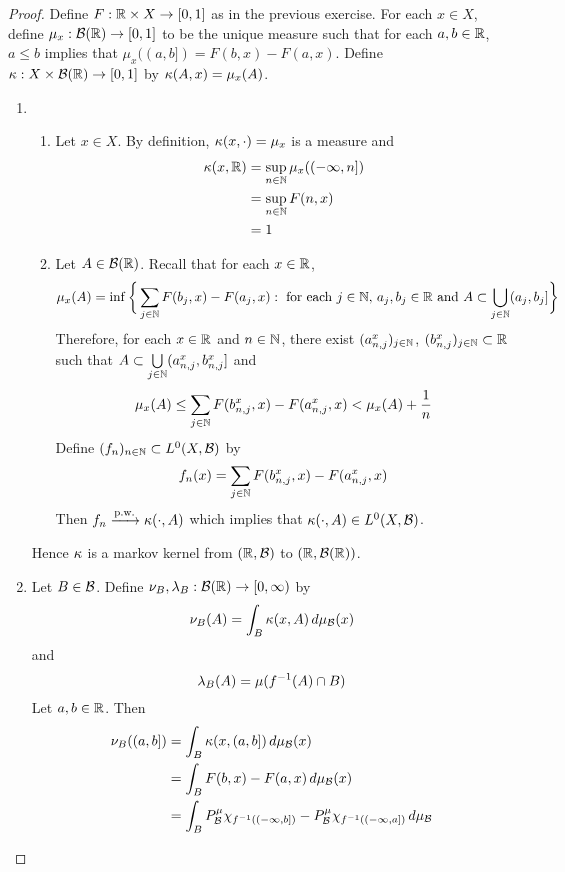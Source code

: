 \documentclass{book}
\begin{document}
	\begin{proof} Define $F:\mathbb{R} \times X \rightarrow [0,1]$ as in the previous exercise. For each $x \in X$, define $\mu_x: \mathcal{B}(\mathbb{R}) \rightarrow [0,1]$ to be the unique measure such that for each $a, b \in \mathbb{R}$, $a \leq b$ implies that $\mu_x((a,b]) = F(b, x) - F(a, x)$. Define $\kappa: X \times \mathcal{B}(\mathbb{R}) \rightarrow [0,1]$ by $\kappa(A, x) = \mu_x(A)$. \\
		\begin{enumerate}
			\item \
			\begin{enumerate}
				\item Let $x \in X$. By definition, $\kappa(x, \cdot) = \mu_x$ is a measure and 
				\begin{align*}
					\kappa(x, \mathbb{R}) 
					& = \sup_{n \in \mathbb{N}} \mu_x((-\infty, n])\\
					& = \sup_{n \in \mathbb{N}} F(n, x) \\
					& = 1 
				\end{align*}
				\item Let $A \in \mathcal{B}(\mathbb{R})$. Recall that for each $x \in \mathbb{R}$,
				$$\mu_x(A) = \inf \bigg \{ \sum\limits_{j \in \mathbb{N}} F(b_j, x) - F(a_j, x): \text{ for each $j \in \mathbb{N}$, $a_j, b_j \in \mathbb{R}$ and } A \subset \bigcup\limits_{j \in \mathbb{N}} (a_j, b_j] \bigg \}$$ 
				Therefore, for each $x \in \mathbb{R}$ and $n \in \mathbb{N}$, there exist $(a^x_{n,j})_{j \in \mathbb{N}}$, $(b^x_{n,j})_{j \in \mathbb{N}} \subset \mathbb{R}$ such that $A \subset \bigcup\limits_{j \in \mathbb{N}} (a^x_{n,j}, b^x_{n,j}]$ and 
				$$\mu_x(A) \leq \sum\limits_{j \in \mathbb{N}} F(b^x_{n,j}, x) - F(a^x_{n,j}, x) < \mu_x(A) + \frac{1}{n}$$
				Define $(f_n)_{n \in \mathbb{N}} \subset L^0(X, \mathcal{B})$ by $$f_n(x) = \sum\limits_{j \in \mathbb{N}} F(b^x_{n,j}, x) - F(a^x_{n,j}, x)$$
				Then $f_n \xrightarrow{\text{p.w.}} \kappa(\cdot, A)$ which implies that $\kappa(\cdot, A) \in L^0(X, \mathcal{B})$. 
			\end{enumerate}
			Hence $\kappa$ is a markov kernel from $(\mathbb{R}, \mathcal{B})$ to $(\mathbb{R}, \mathcal{B}(\mathbb{R}))$.\\
			\item Let $B \in \mathcal{B}$. Define $\nu_B, \lambda_{B}:\mathcal{B}(\mathbb{R}) \rightarrow [0,\infty)$ by 
			$$\nu_B(A) = \int_B \kappa(x, A) \, d \mu_{\mathcal{B}}(x)$$ 
			and
			$$\lambda_B(A) = \mu(f^{-1}(A) \cap B)$$ 
			Let $a,b \in \mathbb{R}$. Then 
			\begin{align*}
				\nu_B((a,b]) 
				& = \int_B \kap(x, (a,b]) \dmu_{\MB}(x) \\
				& = \int_{B} F(b, x) - F(a,x) \dmu_{\MB}(x) \\
				& = \int_{B} P^{\mu}_{\MB}\chi_{f^{-1}((-\infty, b])} - P^{\mu}_{\MB}\chi_{f^{-1}((-\infty, a])} \dmu_{\MB} \\

\end{align*}
\end{enumerate}
\end{proof}
\end{document}
